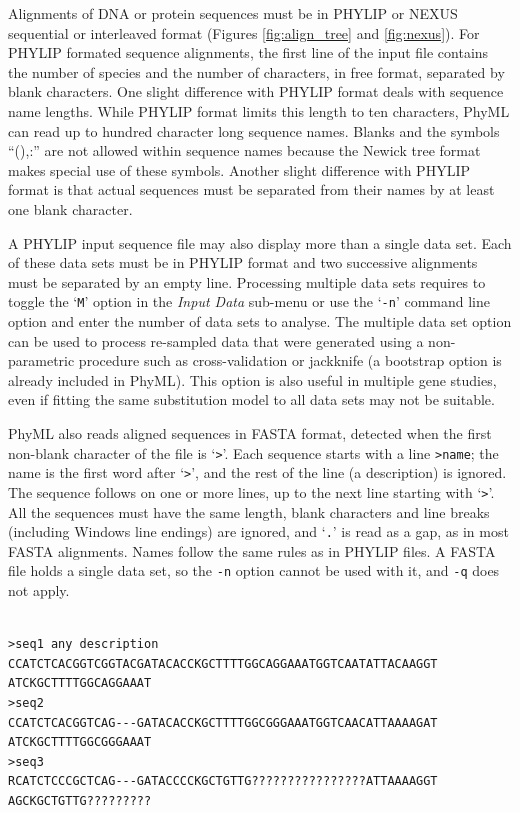 \documentclass[a4paper,12pt]{article}
\newcommand{\x}[1]{\texttt{#1}}
\begin{document}
Alignments   of   DNA   or   protein   sequences   must  be   in   PHYLIP   or   NEXUS
\cite{maddison97} sequential or interleaved format
(Figures \ref{fig:align_tree}  and \ref{fig:nexus}).  For  PHYLIP formated sequence  alignments, the
first line of  the input file contains the number  of species and the number  of characters, in free
format, separated by blank characters.  One slight difference with PHYLIP format deals with sequence
name  lengths.  While PHYLIP  format limits  this length  to ten  characters, PhyML  can read  up to
hundred  character long sequence  names.  Blanks  and the  symbols ``(),:''  are not  allowed within
sequence names because  the Newick tree format  makes special use of these  symbols.  Another slight
difference with  PHYLIP format is  that actual sequences  must be separated  from their names  by at
least one blank character.

A PHYLIP input sequence file  may also display more than a single data set.  Each of these data sets
must  be  in  PHYLIP   format  and  two  successive  alignments  must  be   separated  by  an  empty
line. Processing multiple  data sets requires to toggle  the `\x{M}' option in the  {\em Input Data}
sub-menu or use the `\x{-n}' command line option  and enter the number of data sets to analyse.  The
multiple  data set  option can  be  used to  process re-sampled  data  that were  generated using  a
non-parametric  procedure such  as  cross-validation or  jackknife  (a bootstrap  option is  already
included in PhyML).  This  option is also useful in multiple gene studies,  even if fitting the same
substitution model to all data sets may not be suitable.

PhyML also reads aligned sequences in FASTA format, detected when the first non-blank
character of the file is `\x{>}'. Each sequence starts with a line \x{>name}; the name is the first
word after `\x{>}', and the rest of the line (a description) is ignored. The sequence follows on one
or more lines, up to the next line starting with `\x{>}'. All the sequences must have the same
length, blank characters and line breaks (including Windows line endings) are ignored, and `\x{.}'
is read as a gap, as in most FASTA alignments. Names follow the same rules as in PHYLIP files. A
FASTA file holds a single data set, so the \x{-n} option cannot be used with it, and \x{-q} does not
apply.

\begin{small}
\begin{Verbatim}[frame=single, label=FASTA, samepage=true, baselinestretch=0.5]

>seq1 any description
CCATCTCACGGTCGGTACGATACACCKGCTTTTGGCAGGAAATGGTCAATATTACAAGGT
ATCKGCTTTTGGCAGGAAAT
>seq2
CCATCTCACGGTCAG---GATACACCKGCTTTTGGCGGGAAATGGTCAACATTAAAAGAT
ATCKGCTTTTGGCGGGAAAT
>seq3
RCATCTCCCGCTCAG---GATACCCCKGCTGTTG????????????????ATTAAAAGGT
AGCKGCTGTTG?????????

\end{Verbatim}
\end{small}
\end{document}
